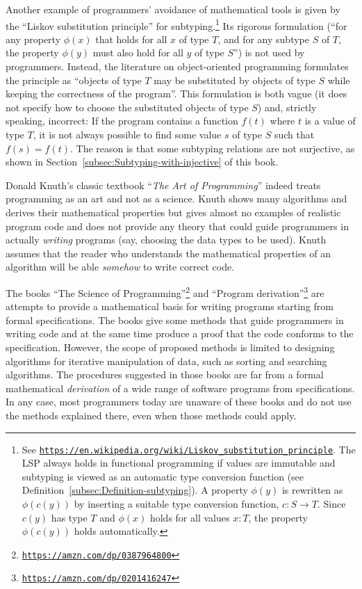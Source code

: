 Another example of programmers\textsf{'} avoidance of mathematical tools is
given by the \textsf{``}Liskov substitution principle\textsf{''}
for subtyping.\footnote{See \texttt{\href{https://en.wikipedia.org/wiki/Liskov_substitution_principle}{https://en.wikipedia.org/wiki/Liskov\_substitution\_principle}}.
The LSP always holds in functional programming if values are immutable
and subtyping is viewed as an automatic type conversion function (see
Definition~\ref{subsec:Definition-subtyping}). A property $\phi(y)$
is rewritten as $\phi(c(y))$ by inserting a suitable type conversion
function, $c:S\rightarrow T$. Since $c(y)$ has type $T$ and $\phi(x)$
holds for all values $x:T$,  the property $\phi(c(y))$ holds automatically.} Its rigorous formulation (\textsf{``}for any property $\phi(x)$ that holds
for all $x$ of type $T$, and for any subtype $S$ of $T$, the property
$\phi(y)$ must also hold for all $y$ of type $S$\textsf{''}) is not used
by programmers. Instead, the literature on object-oriented programming
formulates the principle as \textsf{``}objects of type $T$ may be substituted
by objects of type $S$ while keeping the correctness of the program\textsf{''}.
This formulation  is both vague
(it does not specify how to choose the substituted objects of type
$S$) and, strictly speaking, incorrect: If the program contains a
function $f(t)$ where $t$ is a value of type $T$, it is not always
possible to find some value $s$ of type $S$ such that $f(s)=f(t)$.
The reason is that some subtyping relations are not surjective, as
shown in Section~\ref{subsec:Subtyping-with-injective} of this book.

Donald Knuth\textsf{'}s classic textbook \textsf{``}\emph{The Art of Programming}\textsf{''}
indeed treats programming as an art and not as a science. Knuth shows
many algorithms and derives their mathematical properties but gives
almost no examples of realistic program code and does not provide
any theory that could guide programmers in actually \emph{writing}
programs (say, choosing the data types to be used). Knuth assumes
that the reader who understands the mathematical properties of an
algorithm will be able \emph{somehow} to write correct code.

The books \textsf{``}The Science of Programming\textsf{''}\footnote{\texttt{\href{https://amzn.com/dp/0387964800}{https://amzn.com/dp/0387964800}}}
and \textsf{``}Program derivation\textsf{''}\footnote{\texttt{\href{https://amzn.com/dp/0201416247}{https://amzn.com/dp/0201416247}}}
are attempts to provide a mathematical basis for writing programs
starting from formal specifications. The books give some methods that
guide programmers in writing code and at the same time produce a proof
that the code conforms to the specification. However, the scope of
proposed methods is limited to designing algorithms for iterative
manipulation of data, such as sorting and searching algorithms. The
procedures suggested in those books are far from a formal mathematical
\emph{derivation} of a wide range of software programs from specifications.
In any case, most programmers today are unaware of these books and
do not use the methods explained there, even when those methods could
apply.

